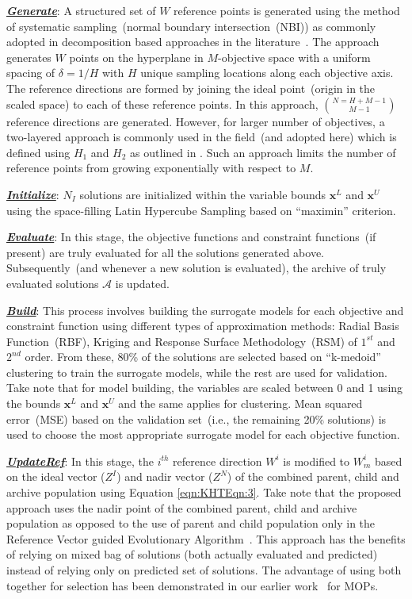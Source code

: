 \noindent \underline{\it \textbf{Generate}}: A structured set of $W$ reference points is generated using the method of systematic sampling~(normal boundary intersection~(NBI)) as commonly adopted in decomposition based approaches in the literature~\cite{KHTdas1998normal,KHTjmd2017,KHTtrivedisurvey}. The approach generates $W$ points on the hyperplane in $M$-objective space with a uniform spacing of $\delta=1/H$ with $H$ unique sampling locations along each objective axis. The reference directions are formed by joining the ideal point~(origin in the scaled space) to each of these reference points. In this approach, $N = {H+M-1}\choose{M-1}$ reference directions are generated. However, for larger number of objectives, a two-layered approach is commonly used in the field~(and adopted here) which is defined using $H_1$ and $H_2$ as outlined in \cite{KHTLi2015dominance}. Such an approach limits the number of reference points from growing exponentially with respect to $M$.

\noindent \underline{\it \textbf{Initialize}}: $N_I$ solutions are initialized within the variable bounds $\textbf{x}^{L}$ and $\textbf{x}^{U}$ using the space-filling Latin Hypercube Sampling based on ``maximin'' criterion.

\noindent \underline{\it \textbf{Evaluate}}: In this stage, the objective functions and constraint functions~(if present) are truly evaluated for all the solutions generated above. {\color{blue}Subsequently~(and whenever a new solution is evaluated)}, the archive of truly evaluated solutions $\mathcal{A}$ is updated. 


\noindent \underline{\it \textbf{Build}}: This process involves building the surrogate models for each objective and constraint function using different types of approximation methods: Radial Basis Function~(RBF), Kriging and Response Surface Methodology~(RSM) of $1^{st}$ and $2^{nd}$ order. From these, 80\% of the solutions are selected based on ``k-medoid'' clustering to train the surrogate models, while the rest are used for validation. Take note that for model building, the variables are scaled between 0 and 1 using the bounds $\textbf{x}^{L}$ and $\textbf{x}^{U}$ and the same applies for clustering. Mean squared error~(MSE) based on the validation set~(i.e., the remaining 20\% solutions) is used to choose the most appropriate surrogate model for each objective function. 

\noindent \underline{\it \textbf{UpdateRef}}: In this stage, the $i^{th}$ reference direction $W^i$ is modified to $W^i_m$ based on the ideal vector ($Z^I$) and nadir vector ($Z^N$) of the combined parent, child and archive population using Equation \ref{eqn:KHTEqn:3}. Take note that  the proposed approach uses the nadir point of the combined parent, child and archive population as opposed to the use of parent and child population only in the Reference Vector guided Evolutionary Algorithm~\cite{KHTCheng2016many}. This approach has the benefits of relying on mixed bag of solutions (both actually evaluated and predicted) instead of relying only on predicted set of solutions. The advantage of using both together for selection has been demonstrated in our earlier work~\cite{bhattacharjee2016multiple} for MOPs.

